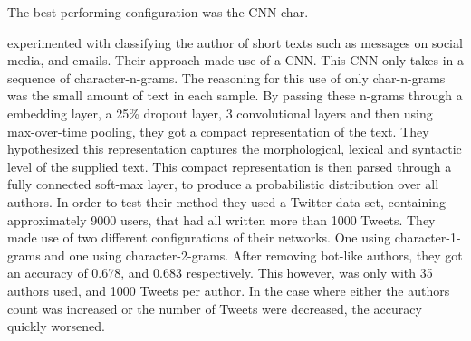 \noindent
The best performing configuration was the CNN-char.

\citet{shrestha2017} experimented with classifying the author of short texts
such as messages on social media, and emails. Their approach made use of a
\gls{CNN}. This \gls{CNN} only takes in a sequence of character-n-grams. The
reasoning for this use of only char-n-grams was the small amount of text in
each sample. By passing these n-grams through a embedding layer, a 25\% dropout
layer, 3 convolutional layers and then using max-over-time pooling, they got
a compact representation of the text. They hypothesized this representation
captures the morphological, lexical and syntactic level of the supplied text.
This compact representation is then parsed through a fully connected soft-max
layer, to produce a probabilistic distribution over all authors. In order
to test their method they used a Twitter data set, containing approximately
9000 users, that had all written more than 1000 Tweets. They made use of two
different configurations of their networks. One using character-1-grams and one
using character-2-grams. After removing bot-like authors, they got an accuracy
of 0.678, and 0.683 respectively. This however, was only with 35 authors used,
and 1000 Tweets per author. In the case where either the authors count was
increased or the number of Tweets were decreased, the accuracy quickly worsened.

